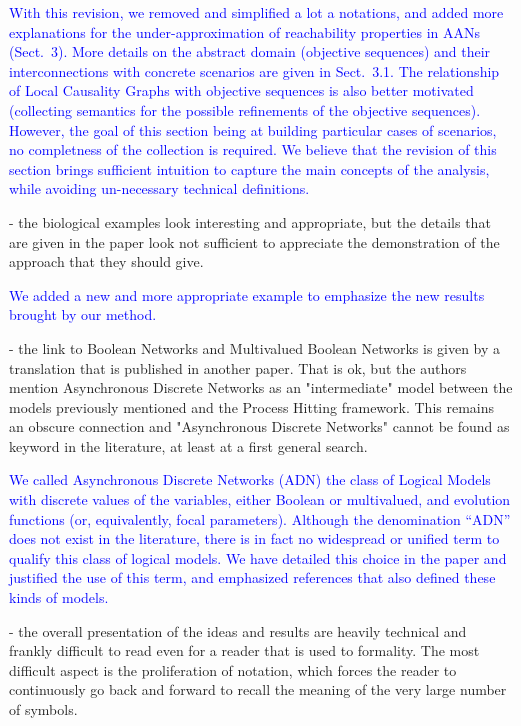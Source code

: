 \documentclass[11pt]{article}
\newcommand{\answer}[1]{\textcolor{blue}{#1}\vspace*{1em}}
\begin{document}
\answer{With this revision, we removed and simplified a lot a notations, and added
more explanations for the under-approximation of reachability properties in AANs
(Sect.~3).
More details on the abstract domain (objective sequences) and their
interconnections with concrete scenarios are given in Sect.~3.1.
The relationship of Local Causality Graphs with objective sequences is also
better motivated (collecting semantics for the possible refinements of the
objective sequences).
However, the goal of this section being at building particular cases of
scenarios, no completness of the collection is required.
We believe that the revision of this section brings sufficient intuition to
capture the main concepts of the analysis, while avoiding un-necessary technical
definitions.
}

- the biological examples look interesting and appropriate, but the details that are given in the paper look not sufficient to appreciate the demonstration of the approach that they should give.

\answer{We added a new and more appropriate example to emphasize the new results brought by our method.}

- the link to Boolean Networks and Multivalued Boolean Networks is given by a translation that is published in another paper. That is ok, but the authors mention Asynchronous Discrete Networks as an "intermediate" model between the models previously mentioned and the Process Hitting framework. This remains an obscure connection and "Asynchronous Discrete Networks" cannot be found as keyword in the literature, at least at a first general search. 

\answer{
We called Asynchronous Discrete Networks (ADN) the class of Logical Models
with discrete values of the variables,
either Boolean or multivalued,
and evolution functions (or, equivalently, focal parameters).
Although the denomination “ADN” does not exist in the literature,
there is in fact no widespread or unified term to qualify this class of logical models.
We have detailed this choice in the paper and justified the use of this term,
and emphasized references that also defined these kinds of models.
}

- the overall presentation of the ideas and results are heavily technical and frankly difficult to read even for a reader that is used to formality. The most difficult aspect is the proliferation of notation, which forces the reader to continuously go back and forward to recall the meaning of the very large number of symbols. 
\end{document}

